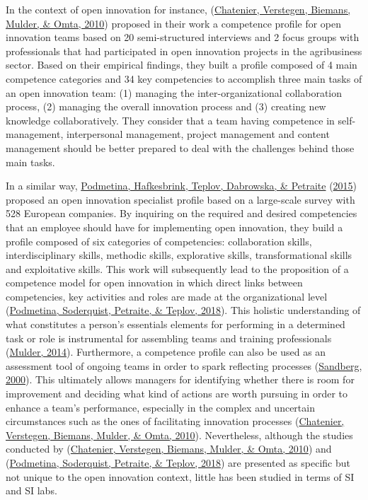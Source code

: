 \documentclass[]{elsarticle} %
\begin{document}
In the context of open innovation for instance,
(\protect\hyperlink{ref-Chatenier2010}{Chatenier, Verstegen, Biemans,
Mulder, \& Omta, 2010}) proposed in their work a competence profile for
open innovation teams based on 20 semi-structured interviews and 2 focus
groups with professionals that had participated in open innovation
projects in the agribusiness sector. Based on their empirical findings,
they built a profile composed of 4 main competence categories and 34 key
competencies to accomplish three main tasks of an open innovation team:
(1) managing the inter-organizational collaboration process, (2)
managing the overall innovation process and (3) creating new knowledge
collaboratively. They consider that a team having competence in
self-management, interpersonal management, project management and
content management should be better prepared to deal with the challenges
behind those main tasks.

In a similar way, \protect\hyperlink{ref-Podmetina2015}{Podmetina,
Hafkesbrink, Teplov, Dabrowska, \& Petraite}
(\protect\hyperlink{ref-Podmetina2015}{2015}) proposed an open
innovation specialist profile based on a large-scale survey with 528
European companies. By inquiring on the required and desired
competencies that an employee should have for implementing open
innovation, they build a profile composed of six categories of
competencies: collaboration skills, interdisciplinary skills, methodic
skills, explorative skills, transformational skills and exploitative
skills. This work will subsequently lead to the proposition of a
competence model for open innovation in which direct links between
competencies, key activities and roles are made at the organizational
level (\protect\hyperlink{ref-Podmetina2018}{Podmetina, Soderquist,
Petraite, \& Teplov, 2018}). This holistic understanding of what
constitutes a person's essentials elements for performing in a
determined task or role is instrumental for assembling teams and
training professionals (\protect\hyperlink{ref-Mulder2014}{Mulder,
2014}). Furthermore, a competence profile can also be used as an
assessment tool of ongoing teams in order to spark reflecting processes
(\protect\hyperlink{ref-Sandberg2000}{Sandberg, 2000}). This ultimately
allows managers for identifying whether there is room for improvement
and deciding what kind of actions are worth pursuing in order to enhance
a team's performance, especially in the complex and uncertain
circumstances such as the ones of facilitating innovation processes
(\protect\hyperlink{ref-Chatenier2010}{Chatenier, Verstegen, Biemans,
Mulder, \& Omta, 2010}). Nevertheless, although the studies conducted by
(\protect\hyperlink{ref-Chatenier2010}{Chatenier, Verstegen, Biemans,
Mulder, \& Omta, 2010}) and
(\protect\hyperlink{ref-Podmetina2018}{Podmetina, Soderquist, Petraite,
\& Teplov, 2018}) are presented as specific but not unique to the open
innovation context, little has been studied in terms of SI and SI labs.
\end{document}
